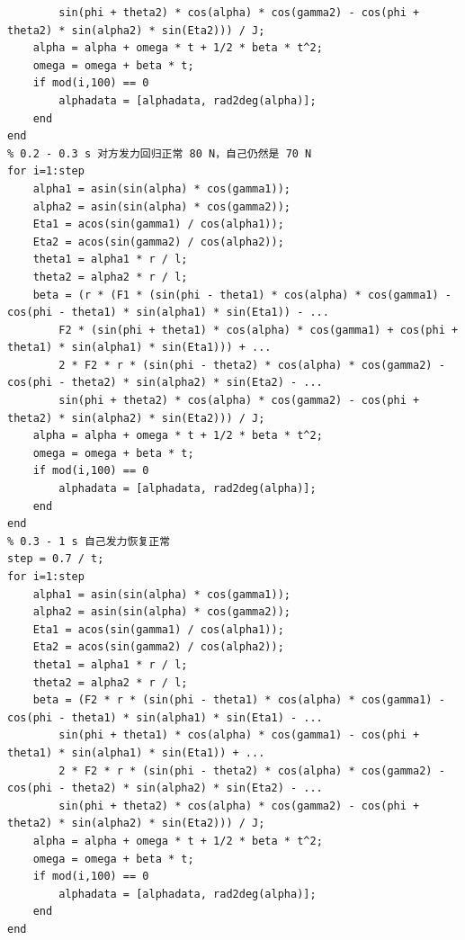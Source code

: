 \documentclass{cumcm}
\begin{document}
\begin{lstlisting}
        sin(phi + theta2) * cos(alpha) * cos(gamma2) - cos(phi + theta2) * sin(alpha2) * sin(Eta2))) / J;
    alpha = alpha + omega * t + 1/2 * beta * t^2;
    omega = omega + beta * t;
    if mod(i,100) == 0
        alphadata = [alphadata, rad2deg(alpha)];
    end
end
% 0.2 - 0.3 s 对方发力回归正常 80 N，自己仍然是 70 N
for i=1:step
    alpha1 = asin(sin(alpha) * cos(gamma1));
    alpha2 = asin(sin(alpha) * cos(gamma2));
    Eta1 = acos(sin(gamma1) / cos(alpha1));
    Eta2 = acos(sin(gamma2) / cos(alpha2));
    theta1 = alpha1 * r / l;
    theta2 = alpha2 * r / l;
    beta = (r * (F1 * (sin(phi - theta1) * cos(alpha) * cos(gamma1) - cos(phi - theta1) * sin(alpha1) * sin(Eta1)) - ...
        F2 * (sin(phi + theta1) * cos(alpha) * cos(gamma1) + cos(phi + theta1) * sin(alpha1) * sin(Eta1))) + ...
        2 * F2 * r * (sin(phi - theta2) * cos(alpha) * cos(gamma2) - cos(phi - theta2) * sin(alpha2) * sin(Eta2) - ...
        sin(phi + theta2) * cos(alpha) * cos(gamma2) - cos(phi + theta2) * sin(alpha2) * sin(Eta2))) / J;
    alpha = alpha + omega * t + 1/2 * beta * t^2;
    omega = omega + beta * t;
    if mod(i,100) == 0
        alphadata = [alphadata, rad2deg(alpha)];
    end
end
% 0.3 - 1 s 自己发力恢复正常
step = 0.7 / t;
for i=1:step
    alpha1 = asin(sin(alpha) * cos(gamma1));
    alpha2 = asin(sin(alpha) * cos(gamma2));
    Eta1 = acos(sin(gamma1) / cos(alpha1));
    Eta2 = acos(sin(gamma2) / cos(alpha2));
    theta1 = alpha1 * r / l;
    theta2 = alpha2 * r / l;
    beta = (F2 * r * (sin(phi - theta1) * cos(alpha) * cos(gamma1) - cos(phi - theta1) * sin(alpha1) * sin(Eta1) - ...
        sin(phi + theta1) * cos(alpha) * cos(gamma1) - cos(phi + theta1) * sin(alpha1) * sin(Eta1)) + ...
        2 * F2 * r * (sin(phi - theta2) * cos(alpha) * cos(gamma2) - cos(phi - theta2) * sin(alpha2) * sin(Eta2) - ...
        sin(phi + theta2) * cos(alpha) * cos(gamma2) - cos(phi + theta2) * sin(alpha2) * sin(Eta2))) / J;
    alpha = alpha + omega * t + 1/2 * beta * t^2;
    omega = omega + beta * t;
    if mod(i,100) == 0
        alphadata = [alphadata, rad2deg(alpha)];
    end
end
\end{lstlisting}
\end{document}
